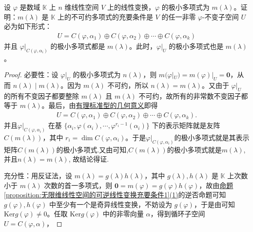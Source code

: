 \documentclass[../../main.tex]{subfiles}
\begin{document}
\begin{proposition}\label{proposition:极小多项式是不可约多项式的刻画}
设 $\varphi$ 是数域 $\mathbb{K}$ 上 $n$ 维线性空间 $V$ 上的线性变换，$\varphi$ 的极小多项式为 $m(\lambda)$。证明：$m(\lambda)$ 是 $\mathbb{K}$ 上的不可约多项式的充要条件是 $V$ 的任一非零 $\varphi$-不变子空间 $U$ 必为如下形式：
\begin{align*}
U = C(\varphi,\alpha_1)\oplus C(\varphi,\alpha_2)\oplus\cdots\oplus C(\varphi,\alpha_k)
\end{align*}
并且 $\varphi|_{C(\varphi,\alpha_i)}$ 的极小多项式都是 $m(\lambda)$。此时，$\varphi|_U$ 的极小多项式也是 $m(\lambda)$。
\end{proposition}
\begin{proof}
{\heiti 必要性：}设 $\varphi|_U$ 的极小多项式为 $n(\lambda)$，则 $m(\varphi|_U)=m(\varphi)|_U = \mathbf{0}$，从而 $n(\lambda)\mid m(\lambda)$。因为 $m(\lambda)$ 不可约，所以 $n(\lambda)=m(\lambda)$。又由于 $\varphi|_U$ 的所有不变因子都要整除 $m(\lambda)$ 且 $m(\lambda)$ 不可约，故所有的非常数不变因子都等于 $m(\lambda)$。最后，由\hyperref[theorem:有理标准型的几何意义]{有理标准型的几何意义}即得
\begin{align*}
U = C(\varphi,\alpha_1)\oplus C(\varphi,\alpha_2)\oplus\cdots\oplus C(\varphi,\alpha_k).
\end{align*}
并且\(\varphi|_{C(\varphi,\alpha_i)}\) 在基 \(\{\alpha_i,\varphi(\alpha_i),\cdots,\varphi^{r_i - 1}(\alpha_i)\}\) 下的表示矩阵就是友阵 \(C(m(\lambda))\)，其中 \(r_i = \dim C(\varphi,\alpha_i)\)。于是\(\varphi|_{C(\varphi,\alpha_i)}\)的极小多项式就是其表示矩阵\(C(m(\lambda))\)的极小多项式.又由可知,\(C(m(\lambda))\)的极小多项式就是$m(\lambda)$,并且$n(\lambda)=m(\lambda)$,
故结论得证.

{\heiti 充分性：}用反证法，设 $m(\lambda)=g(\lambda)h(\lambda)$，其中 $g(\lambda),h(\lambda)$ 是 $\mathbb{K}$ 上次数小于 $m(\lambda)$ 次数的首一多项式，则 $\mathbf{0}=m(\varphi)=g(\varphi)h(\varphi)$，故由\hyperref[proposition:无限维线性空间的可逆线性变换充要条件1]{命题\ref{proposition:无限维线性空间的可逆线性变换充要条件1}(1)}的逆否命题可知 $g(\varphi),h(\varphi)$ 中至少有一个是奇异线性变换，不妨设为 $g(\varphi)$，于是由可知 $\mathrm{Ker}g(\varphi)\neq 0$。任取 $\mathrm{Ker}g(\varphi)$ 中的非零向量 $\alpha$，得到循环子空间 $U = C(\varphi,\alpha)$，



\end{proof}
\end{document}

